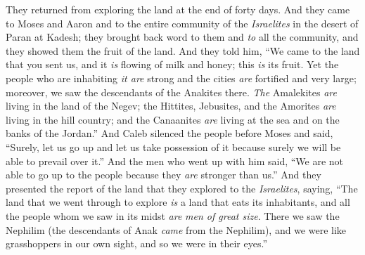 \begin{biblechapter}
 They returned from exploring the land at the end of forty days.
\verse And they came to Moses and Aaron and to the entire community of the \textit{Israelites} in the desert of Paran at Kadesh; they brought back word to them and \textit{to} all the community, and they showed them the fruit of the land.
\verse And they told him, “We came to the land that you sent us, and it \textit{is} flowing of milk and honey; this \textit{is} its fruit.
\verse Yet the people who are inhabiting \textit{it are} strong and the cities \textit{are} fortified and very large; moreover, we saw the descendants of the Anakites there.
\verse \textit{The} Amalekites \textit{are} living in the land of the Negev; the Hittites, Jebusites, and the Amorites \textit{are} living in the hill country; and the Canaanites \textit{are} living at the sea and on the banks of the Jordan.”
\verse And Caleb silenced the people before Moses and said, “Surely, let us go up and let us take possession of it because surely we will be able to prevail over it.”
\verse And the men who went up with him said, “We are not able to go up to the people because they \textit{are} stronger than us.”
\verse And they presented the report of the land that they explored to the \textit{Israelites}, saying, “The land that we went through to explore \textit{is} a land that eats its inhabitants, and all the people whom we saw in its midst \textit{are} \textit{men of great size}.
\verse There we saw the Nephilim (the descendants of Anak \textit{came} from the Nephilim), and we were like grasshoppers in our own sight, and so we were in their eyes.”
\end{biblechapter}

